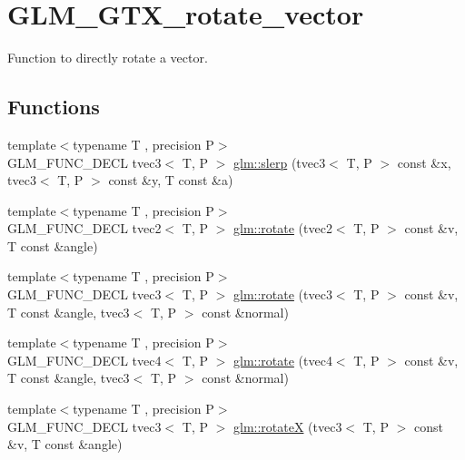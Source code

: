 \hypertarget{group__gtx__rotate__vector}{}\section{G\+L\+M\+\_\+\+G\+T\+X\+\_\+rotate\+\_\+vector}
\label{group__gtx__rotate__vector}


Function to directly rotate a vector.  


\subsection*{Functions}
\begin{DoxyCompactItemize}
\item 
{\footnotesize template$<$typename T , precision P$>$ }\\G\+L\+M\+\_\+\+F\+U\+N\+C\+\_\+\+D\+E\+C\+L tvec3$<$ T, P $>$ \hyperlink{group__gtx__rotate__vector_gafc9ab3101c3f3799f3d5d6d9d3baac09}{glm\+::slerp} (tvec3$<$ T, P $>$ const \&x, tvec3$<$ T, P $>$ const \&y, T const \&a)
\item 
{\footnotesize template$<$typename T , precision P$>$ }\\G\+L\+M\+\_\+\+F\+U\+N\+C\+\_\+\+D\+E\+C\+L tvec2$<$ T, P $>$ \hyperlink{group__gtx__rotate__vector_ga9bff444fb191e2e089a906b899cd033d}{glm\+::rotate} (tvec2$<$ T, P $>$ const \&v, T const \&angle)
\item 
{\footnotesize template$<$typename T , precision P$>$ }\\G\+L\+M\+\_\+\+F\+U\+N\+C\+\_\+\+D\+E\+C\+L tvec3$<$ T, P $>$ \hyperlink{group__gtx__rotate__vector_ga526b6f8995bc0946aa1a04e9297de7c6}{glm\+::rotate} (tvec3$<$ T, P $>$ const \&v, T const \&angle, tvec3$<$ T, P $>$ const \&normal)
\item 
{\footnotesize template$<$typename T , precision P$>$ }\\G\+L\+M\+\_\+\+F\+U\+N\+C\+\_\+\+D\+E\+C\+L tvec4$<$ T, P $>$ \hyperlink{group__gtx__rotate__vector_gaf4d59dd2f668f9ffb38048055d1316bd}{glm\+::rotate} (tvec4$<$ T, P $>$ const \&v, T const \&angle, tvec3$<$ T, P $>$ const \&normal)
\item 
{\footnotesize template$<$typename T , precision P$>$ }\\G\+L\+M\+\_\+\+F\+U\+N\+C\+\_\+\+D\+E\+C\+L tvec3$<$ T, P $>$ \hyperlink{group__gtx__rotate__vector_ga0c2dc9f8507bffcbb957db9818b18508}{glm\+::rotate\+X} (tvec3$<$ T, P $>$ const \&v, T const \&angle)
\item 

\end{DoxyCompactItemize}
